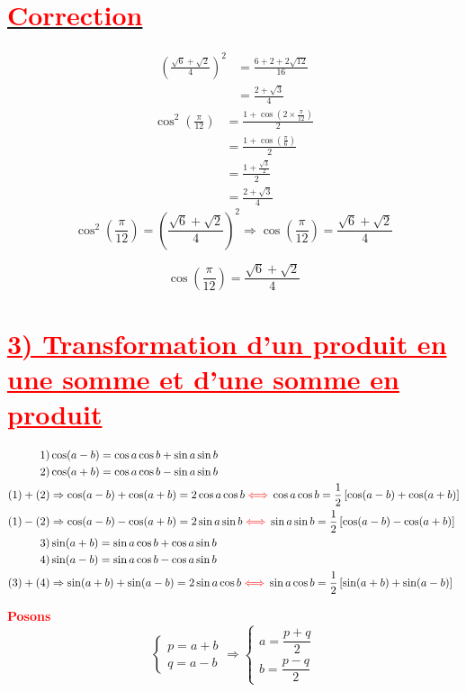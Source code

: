 \documentclass[a4paper,12pt]{article}
\begin{document}
\section*{\underline{\textcolor{red}{Correction}}}

\[
\begin{aligned}
\left(\frac{\sqrt{6} + \sqrt{2}}{4}\right)^2 &= \frac{6 + 2 + 2\sqrt{12}}{16} \\
&= \frac{2 + \sqrt{3}}{4}
\end{aligned}
\]
\vspace{1cm}
\[
\begin{aligned}
\cos^2\left(\frac{\pi}{12}\right) 
&= \frac{1 + \cos\left(2 \times \frac{\pi}{12}\right)}{2} \\
&= \frac{1 + \cos\left(\frac{\pi}{6}\right)}{2} \\
&= \frac{1 + \frac{\sqrt{3}}{2}}{2} \\
&= \frac{2 + \sqrt{3}}{4}
\end{aligned}
\]
\vspace{1cm}
\[
\cos^2\left(\frac{\pi}{12}\right)
= \left( \frac{\sqrt{6} + \sqrt{2}}{4} \right)^2
\Rightarrow \cos\left(\frac{\pi}{12}\right) = \frac{\sqrt{6} + \sqrt{2}}{4}
\]

\[
\boxed{ \cos\left( \frac{\pi}{12} \right) = \frac{\sqrt{6} + \sqrt{2}}{4} }
\]

\section*{\textcolor{red}{\underline{3) Transformation d’un produit en une somme et d'une somme en produit}}}

\(
\begin{aligned}
\text{1)}&\cos(a - b) = \cos a \cos b + \sin a \sin b \\
\text{2)}&\cos(a + b) = \cos a \cos b - \sin a \sin b \\
\text{(1)} + \text{(2)}&\Rightarrow \cos(a - b) + \cos(a + b) = 2\cos a \cos b \textcolor{red}{\iff } \cos a \cos b =\frac{1}{2}\left[\cos(a - b) + \cos(a + b)\right] \\
\text{(1)} - \text{(2)}&\Rightarrow \cos(a - b) - \cos(a + b) = 2\sin a \sin b \textcolor{red}{\iff}\sin a \sin b=\frac{1}{2}\left[\cos(a - b) - \cos(a + b)\right] \\
\text{3)}&\sin(a + b) = \sin a \cos b + \cos a \sin b \\
\text{4)}&\sin(a - b) = \sin a \cos b - \cos a \sin b \\
\text{(3)} + \text{(4)}&\Rightarrow \sin(a + b) + \sin(a - b) = 2\sin a \cos b \textcolor{red}{\iff}\sin a \cos b=\frac{1}{2}\left[\sin(a + b) + \sin(a - b)\right]
\end{aligned}
\)








\medskip

\noindent\textbf{\textcolor{red}{Posons}} 
\[
\left\{
\begin{array}{l}
p = a + b \\
q = a - b
\end{array}
\right.
\Rightarrow
\left\{
\begin{array}{l}
a = \dfrac{p + q}{2} \\
b = \dfrac{p - q}{2}
\end{array}
\right.
\]
\end{document}
